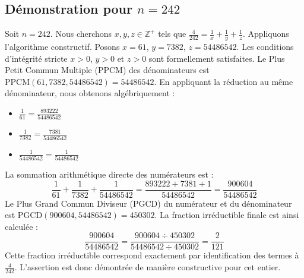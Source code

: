 \documentclass[11pt,a4paper]{article}
\begin{document}
\subsection{Démonstration pour $n = 242$}
Soit $n = 242$. Nous cherchons $x, y, z \in \mathbb{Z}^{+}$ tels que $\frac{4}{242} = \frac{1}{x} + \frac{1}{y} + \frac{1}{z}$.
Appliquons l'algorithme constructif. Posons $x = 61$, $y = 7382$, $z = 54486542$.
Les conditions d'intégrité stricte $x > 0$, $y > 0$ et $z > 0$ sont formellement satisfaites.
Le Plus Petit Commun Multiple (PPCM) des dénominateurs est $\text{PPCM}(61, 7382, 54486542) = 54486542$.
En appliquant la réduction au même dénominateur, nous obtenons algébriquement :
\begin{itemize}
    \item $\frac{1}{61} = \frac{893222}{54486542}$
    \item $\frac{1}{7382} = \frac{7381}{54486542}$
    \item $\frac{1}{54486542} = \frac{1}{54486542}$
\end{itemize}
La sommation arithmétique directe des numérateurs est :
$$ \frac{1}{61} + \frac{1}{7382} + \frac{1}{54486542} = \frac{893222 + 7381 + 1}{54486542} = \frac{900604}{54486542} $$
Le Plus Grand Commun Diviseur (PGCD) du numérateur et du dénominateur est $\text{PGCD}(900604, 54486542) = 450302$.
La fraction irréductible finale est ainsi calculée :
$$ \frac{900604}{54486542} = \frac{900604 \div 450302}{54486542 \div 450302} = \frac{2}{121} $$
Cette fraction irréductible correspond exactement par identification des termes à $\frac{4}{242}$. L'assertion est donc démontrée de manière constructive pour cet entier.
\end{document}
